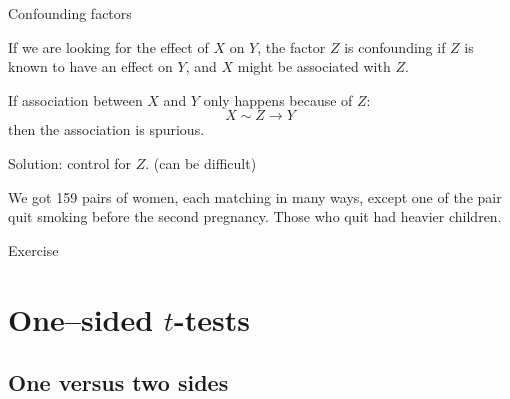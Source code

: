 %
\begin{frame}{Confounding factors}

If we are looking for the effect of $X$ on $Y$,
the factor $Z$ is \alert{confounding} if $Z$ is known to have an effect on $Y$,
and $X$ might be associated with $Z$.

\vspace{2em}

If association between $X$ and $Y$ only happens because of $Z$:
\[
  X \sim Z \longrightarrow Y
\]
then the association is \alert{spurious}.

\vspace{2em}

\alert{Solution:} control for $Z$.  (can be difficult)

\vspace{2em}

 We got 159 pairs of women,
    each matching in many ways, except one of the pair quit smoking before the second pregnancy.
    Those who quit had heavier children.

\end{frame}

\begin{frame}{Exercise}

\end{frame}


\section{One--sided $t$-tests}

\subsection{One versus two sides}

